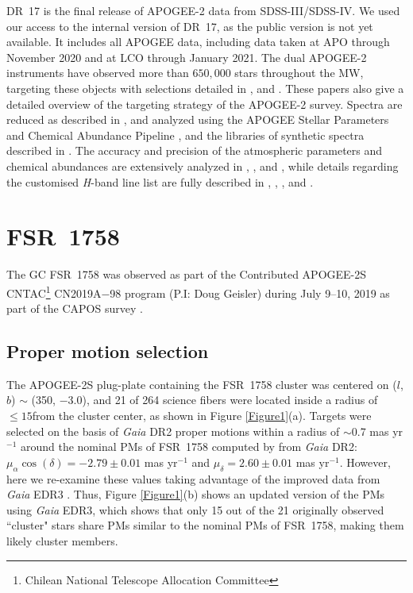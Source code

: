 \documentclass[longauth]{aa} %
\begin{document}
DR~17 is the final release of APOGEE-2 data from SDSS-III/SDSS-IV. We used our access to the internal version of DR~17, as the public version is not yet available. It includes all APOGEE data, including data taken at APO through November 2020 and at LCO through January 2021. The dual APOGEE-2 instruments have observed more than $ 650,000$ stars throughout the MW, targeting these objects with selections detailed in \citet{Zasowski2017}, \citet{Santana2021} and \citet{Beaton2021}. These papers also give a detailed overview of the targeting strategy of the APOGEE-2 survey. Spectra are reduced as described in \citet{Nidever2015}, and analyzed using the APOGEE Stellar Parameters and Chemical Abundance Pipeline \citep[ASPCAP;][]{Garcia2016}, and the libraries of synthetic spectra described in \citet{Zamora2015}. The accuracy and precision of the atmospheric parameters and chemical abundances are extensively analyzed in \citet{Holtzman2018}, \citet{Henrik2018}, and \citet{Henrik2020}, while details regarding the customised \textit{H}-band line list are fully described in \citet{Shetrone2015}, \citet{Hasselquist2016}, \citet{Cunha2017}, and \citet{Smith2021}. 

\section{FSR~1758}
\label{fsr1758}

The GC FSR~1758 was observed as part of the Contributed APOGEE-2S CNTAC\footnote{Chilean National Telescope Allocation Committee} CN2019A$-$98 program (P.I: Doug Geisler) during July 9--10, 2019 as part of the CAPOS survey \citep{Geisler2021}. 

\subsection{Proper motion selection}

The APOGEE-2S plug-plate containing the FSR~1758 cluster was centered on ($l$,$b$) $\sim$ (350, $-3.0$), and 21 of 264 science fibers were located inside a radius of $\leq 15$\arcmin from the cluster center, as shown in Figure \ref{Figure1}(a). Targets were selected on the basis of \textit{Gaia} DR2 \citep{Brown2018} proper motions within a radius of $\sim$0.7 mas yr$^{-1}$ around the nominal PMs of FSR~1758 computed by \citet{Villanova2019} from \textit{Gaia} DR2:$\mu_{\alpha}\cos(\delta)= -2.79 \pm 0.01$ mas yr$^{-1}$ and $\mu_{\delta}=2.60\pm0.01$ mas yr$^{-1}$. However, here we re-examine these values taking advantage of the improved data from \textit{Gaia} EDR3 \citep{Brown2020}. Thus, Figure \ref{Figure1}(b) shows an updated version of the PMs using \textit{Gaia} EDR3, which shows that only 15 out of the 21 originally observed ``cluster" stars share PMs similar to the nominal PMs of FSR~1758, making them likely cluster members.
\end{document}
